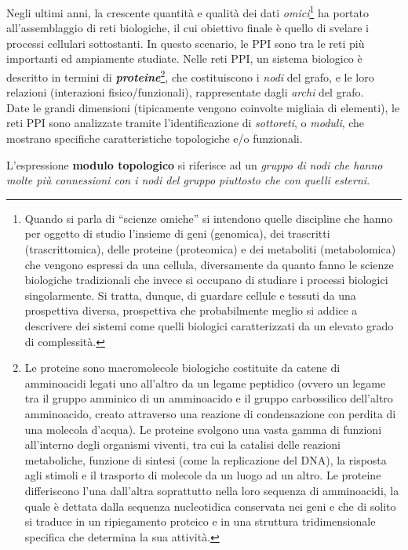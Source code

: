 \documentclass[11pt]{article}
\begin{document}
Negli ultimi anni, la crescente quantità e qualità dei dati \textit{omici}\footnote{Quando si parla di “scienze omiche” si intendono quelle discipline che hanno per oggetto di studio l’insieme di geni (genomica), dei trascritti (trascrittomica), delle proteine (proteomica) e dei metaboliti (metabolomica) che vengono espressi da una cellula, diversamente da quanto fanno le scienze biologiche tradizionali che invece si occupano di studiare i processi biologici singolarmente. Si tratta, dunque, di guardare cellule e tessuti da una prospettiva diversa, prospettiva che probabilmente meglio si addice a descrivere dei sistemi come quelli biologici caratterizzati da un elevato grado di complessità.} ha portato all'assemblaggio di reti biologiche, il cui obiettivo finale è quello di svelare i processi cellulari sottostanti. In questo scenario, le PPI sono tra le reti più importanti ed ampiamente studiate. Nelle reti PPI, un sistema biologico è descritto in termini di \textit{\textbf{proteine}}\footnote{Le proteine sono macromolecole biologiche costituite da catene di amminoacidi legati uno all'altro da un legame peptidico (ovvero un legame tra il gruppo amminico di un amminoacido e il gruppo carbossilico dell'altro amminoacido, creato attraverso una reazione di condensazione con perdita di una molecola d'acqua). Le proteine svolgono una vasta gamma di funzioni all'interno degli organismi viventi, tra cui la catalisi delle reazioni metaboliche, funzione di sintesi (come la replicazione del DNA), la risposta agli stimoli e il trasporto di molecole da un luogo ad un altro. Le proteine differiscono l'una dall'altra soprattutto nella loro sequenza di amminoacidi, la quale è dettata dalla sequenza nucleotidica conservata nei geni e che di solito si traduce in un ripiegamento proteico e in una struttura tridimensionale specifica che determina la sua attività.}, 
che costituiscono i \textit{nodi} del grafo, e le loro relazioni (interazioni fisico/funzionali), rappresentate dagli \textit{archi} del grafo.\\

Date le grandi dimensioni (tipicamente vengono coinvolte migliaia di elementi), le reti PPI sono analizzate tramite l'identificazione di \textit{sottoreti}, o \textit{moduli}, che mostrano specifiche caratteristiche topologiche e/o funzionali.

L'espressione \textbf{modulo topologico} si riferisce ad un \textit{gruppo di nodi che hanno molte più connessioni con i nodi del gruppo piuttosto che con quelli esterni}. 
\end{document}
